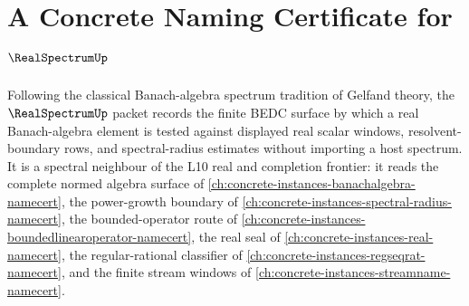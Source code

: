 \chapter{A Concrete Naming Certificate for $\RealSpectrumUp$}
\label{ch:concrete-instances-real-spectrum-namecert}

Following the classical Banach-algebra spectrum tradition of Gelfand theory, the $\RealSpectrumUp$ packet records the finite BEDC surface by which a real Banach-algebra element is tested against displayed real scalar windows, resolvent-boundary rows, and spectral-radius estimates without importing a host spectrum. It is a spectral neighbour of the L10 real and completion frontier: it reads the complete normed algebra surface of \autoref{ch:concrete-instances-banachalgebra-namecert}, the power-growth boundary of \autoref{ch:concrete-instances-spectral-radius-namecert}, the bounded-operator route of \autoref{ch:concrete-instances-boundedlinearoperator-namecert}, the real seal of \autoref{ch:concrete-instances-real-namecert}, the regular-rational classifier of \autoref{ch:concrete-instances-regseqrat-namecert}, and the finite stream windows of \autoref{ch:concrete-instances-streamname-namecert}.

